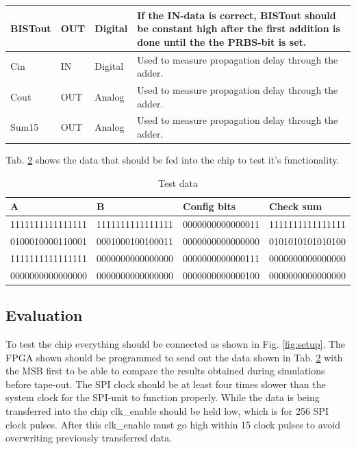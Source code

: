 \begin{table}[H]
\begin{tabularx}{\linewidth}{|l|l|l|X|}
    BISTout & OUT & Digital & If the IN-data is correct, BISTout should be constant high after the first addition is done until the the PRBS-bit is set.  \\ \hline
    Cin & IN & Digital & Used to measure propagation delay through the adder. \\ \hline
    Cout & OUT & Analog & Used to measure propagation delay through the adder. \\ \hline
    Sum15 & OUT & Analog & Used to measure propagation delay through the adder. \\ \hline
  \end{tabularx}
  \label{tab:pins}
\end{table}



\newpage

Tab. \ref{tab:test_data} shows the data that should be fed into the chip to test it's functionality.

\begin{table}[H]
  \caption{Test data}
  \centering
  \begin{tabularx}{\linewidth}{|X|X|X|X|}
    \hline
    \textbf{A} & \textbf{B} & \textbf{Config bits} & \textbf{Check sum} \\ \hline
    1111111111111111 & 1111111111111111 & 0000000000000011 & 1111111111111111\\ \hline
    0100010000110001 & 0001000100100011 & 0000000000000000 & 0101010101010100\\ \hline
    1111111111111111 & 0000000000000000 & 0000000000000111 & 0000000000000000\\ \hline
    0000000000000000 & 0000000000000000 & 0000000000000100 & 0000000000000000\\ \hline
  \end{tabularx}
  \label{tab:test_data}
\end{table}   

\subsection{Evaluation}
To test the chip everything should be connected as shown in Fig. \ref{fig:setup}. The FPGA shown should be programmed to send out the data shown in Tab. \ref{tab:test_data} with the MSB first to be able to compare the results obtained during simulations before tape-out. The SPI clock should be at least four times slower than the system clock for the SPI-unit to function properly. While the data is being transferred into the chip clk\_enable should be held low, which is for 256 SPI clock pulses. After this clk\_enable must go high within 15 clock pulses to avoid overwriting previously transferred data.


